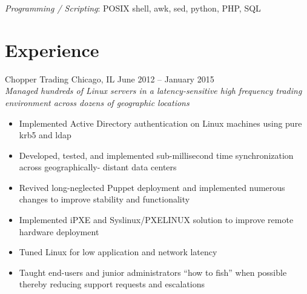 \documentclass[9pt]{extarticle} %
\begin{document}
\bigskip

\textit{Programming / Scripting}: POSIX shell, awk, sed, python, PHP, SQL


\section{Experience}


\begin{indented}
	Chopper Trading \tab Chicago, IL \tab June 2012 -- January 2015\\
	\textit{Managed hundreds of Linux servers in a latency-sensitive high frequency trading environment across dozens of geographic locations}
	\begin{itemize}
		\item Implemented Active Directory authentication on Linux machines using pure krb5 and ldap
		\item Developed, tested, and implemented sub-millisecond time synchronization across geographically- distant data centers
		\item Revived long-neglected Puppet deployment and implemented numerous changes to improve stability and functionality
		\item Implemented iPXE and Syslinux/PXELINUX solution to improve remote hardware deployment
		\item Tuned Linux for low application and network latency
		\item Taught end-users and junior administrators ``how to fish'' when possible thereby reducing support requests and escalations
	\end{itemize}
\end{indented}

\bigskip


\end{document}
